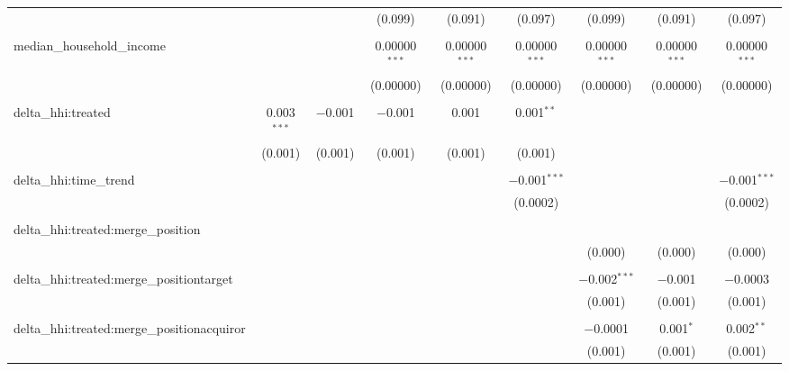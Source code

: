 \begin{table}[H]
{\begin{tabular}{@{\extracolsep{5pt}}lcccccccc}
   &  &  & (0.099) & (0.091) & (0.097) & (0.099) & (0.091) & (0.097) \\  

   & & & & & & & & \\  

  median\_household\_income &  &  & 0.00000$^{***}$ & 0.00000$^{***}$ & 0.00000$^{***}$ & 0.00000$^{***}$ & 0.00000$^{***}$ & 0.00000$^{***}$ \\  

   &  &  & (0.00000) & (0.00000) & (0.00000) & (0.00000) & (0.00000) & (0.00000) \\  

   & & & & & & & & \\  

  delta\_hhi:treated & 0.003$^{***}$ & $-$0.001 & $-$0.001 & 0.001 & 0.001$^{**}$ &  &  &  \\  

   & (0.001) & (0.001) & (0.001) & (0.001) & (0.001) &  &  &  \\  

   & & & & & & & & \\  

  delta\_hhi:time\_trend &  &  &  &  & $-$0.001$^{***}$ &  &  & $-$0.001$^{***}$ \\  

   &  &  &  &  & (0.0002) &  &  & (0.0002) \\  

   & & & & & & & & \\  

  delta\_hhi:treated:merge\_position &  &  &  &  &  &  &  &  \\  

   &  &  &  &  &  & (0.000) & (0.000) & (0.000) \\  

   & & & & & & & & \\  

  delta\_hhi:treated:merge\_positiontarget &  &  &  &  &  & $-$0.002$^{***}$ & $-$0.001 & $-$0.0003 \\  

   &  &  &  &  &  & (0.001) & (0.001) & (0.001) \\  

   & & & & & & & & \\  

  delta\_hhi:treated:merge\_positionacquiror &  &  &  &  &  & $-$0.0001 & 0.001$^{*}$ & 0.002$^{**}$ \\  

   &  &  &  &  &  & (0.001) & (0.001) & (0.001) \\  


\end{tabular}}
\end{table}
